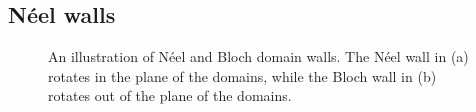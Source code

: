 \documentclass[12pt, a4paper, twoside, openright]{article}		%
\numberwithin{equation}{section}
\begin{document}
\subsection{N\'{e}el walls}
\begin{figure}[tpb]
\centering
\begin{minipage}{.9\textwidth}
\end{minipage}%
\caption{An illustration of N\'{e}el and Bloch domain walls. The N\'{e}el wall in (a) rotates in the plane of the domains, while the Bloch wall in (b) rotates out of the plane of the domains.}
\label{fig:NeelVsBlochWall}
\end{figure}
\end{document}
